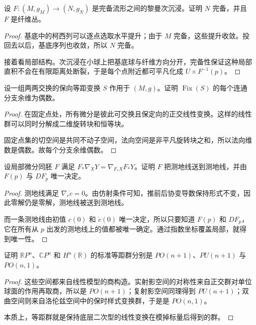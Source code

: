 \documentclass[11pt,a4paper,openany]{ctexbook}
\numberwithin{equation}{chapter}
\begin{document}
\begin{exercise}
设 \(F\colon(M,g_M)\to(N,g_N)\) 是完备流形之间的黎曼次沉浸。证明 \(N\) 完备，并且 \(F\) 是纤维丛。
\end{exercise}
\begin{proof}
基底中的柯西列可以逐点选取水平提升；由于 \(M\) 完备，这些提升收敛。投回去以后，基底序列也收敛，所以 \(N\) 完备。

接着看局部结构。次沉浸在小球上把基底球与纤维方向分开，完备性保证这种局部直积不会在有限距离处断裂，于是每个点附近都可平凡化成 \(U\times F^{-1}(p)\)。
\end{proof}

\begin{exercise}
设一组两两交换的保向等距变换 \(S\) 作用于 \((M,g)\)。证明 \(\operatorname{Fix}(S)\) 的每个连通分支余维为偶数。
\end{exercise}
\begin{proof}
在固定点处，所有微分是彼此可交换且保定向的正交线性变换。这样的线性群可以同时分解成二维旋转块和恒等块。

固定点集的切空间是共同不动子空间，法向空间是非平凡旋转块之和，所以法向维数是偶数。故每个分支余维偶数。
\end{proof}

\begin{exercise}
设局部微分同胚 \(F\) 满足 \(F_*\nabla_XY=\nabla_{F_*X}F_*Y\)。证明 \(F\) 把测地线送到测地线，并由 \(F(p)\) 与 \(DF_p\) 唯一决定。
\end{exercise}
\begin{proof}
测地线满足 \(\nabla_{\dot c}\dot c=0\)。由仿射条件可知，推前后协变导数保持形式不变，因此零解仍是零解，测地线被送到测地线。

而一条测地线由初值 \(c(0)\) 和 \(\dot c(0)\) 唯一决定，所以只要知道 \(F(p)\) 和 \(DF_p\)，它在所有从 \(p\) 出发的测地线上的值都被唯一确定。通过指数坐标覆盖局部，就得到唯一性。
\end{proof}

\begin{exercise}
证明 \(\mathbb RP^n\)、\(\mathbb CP^n\) 和 \(H^n(\mathbb R)\) 的标准等距群分别是 \(PO(n+1)\)、\(PU(n+1)\) 与 \(PO(n,1)\)。
\end{exercise}
\begin{proof}
这些空间都来自线性模型的商构造。实射影空间的对称性来自正交群对单位球面的作用再取商，所以是 \(PO(n+1)\)；复射影空间同理得到 \(PU(n+1)\)；双曲空间则来自洛伦兹空间中的保时样式变换群，于是是 \(PO(n,1)\)。

本质上，等距群就是保持底层二次型的线性变换在模掉标量后得到的群。
\end{proof}
\end{document}
